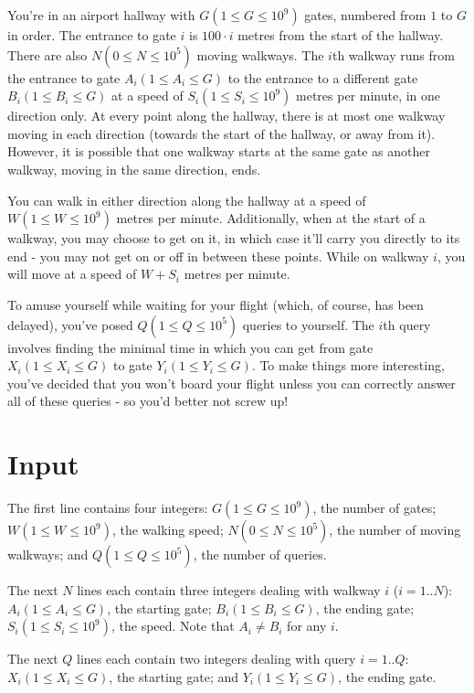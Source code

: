 
You're in an airport hallway with $G (1 \leq G \leq 10^9)$ gates, numbered from $1$ to $G$ in order. The entrance to gate $i$ is $100 \cdot i$ metres from the start of the hallway. There are also $N (0 \leq N \leq 10^5)$ moving walkways. The $i$th walkway runs from the entrance to gate $A_i (1 \leq A_i \leq G)$ to the entrance to a different gate $B_i (1 \leq B_i \leq G)$ at a speed of $S_i (1 \leq S_i \leq 10^9)$ metres per minute, in one direction only. At every point along the hallway, there is at most one walkway moving in each direction (towards the start of the hallway, or away from it). However, it is possible that one walkway starts at the same gate as another walkway, moving in the same direction, ends. 

You can walk in either direction along the hallway at a speed of $W (1 \leq W \leq 10^9)$ metres per minute. Additionally, when at the start of a walkway, you may choose to get on it, in which case it'll carry you directly to its end - you may not get on or off in between these points. While on walkway $i$, you will move at a speed of $W + S_i$ metres per minute.

To amuse yourself while waiting for your flight (which, of course, has been delayed), you've posed $Q (1 \leq Q \leq 10^5)$ queries to yourself. The $i$th query involves finding the minimal time in which you can get from gate $X_i (1 \leq X_i \leq G)$ to gate $Y_i (1 \leq Y_i \leq G)$. To make things more interesting, you've decided that you won't board your flight unless you can correctly answer all of these queries - so you'd better not screw up!

\section*{Input}
The first line contains four integers: $G (1 \leq G \leq 10^9)$, the number of gates; $W (1 \leq W \leq 10^9)$, the walking speed; $N (0 \leq N \leq 10^5)$, the number of moving walkways; and $Q (1 \leq Q \leq 10^5)$, the number of queries. 

The next $N$ lines each contain three integers dealing with walkway $i$ ($i = 1..N$): $A_i (1 \leq A_i \leq G)$, the starting gate; $B_i (1 \leq B_i \leq G)$, the ending gate; $S_i (1 \leq S_i \leq 10^9)$, the speed. Note that $A_i \neq B_i$ for any $i$. 

The next $Q$ lines each contain two integers dealing with query $i = 1..Q$: $X_i (1 \leq X_i \leq G)$, the starting gate; and $Y_i (1 \leq Y_i \leq G)$, the ending gate.

